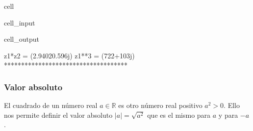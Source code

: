 \documentclass[letterpaper,10pt,english]{jupyterBook}
\begin{document}
\begin{sphinxuseclass}{cell}\begin{sphinxVerbatimInput}

\begin{sphinxuseclass}{cell_input}
\begin{sphinxVerbatim}[commandchars=\\\{\}]
  
  
 
 
\end{sphinxVerbatim}

\end{sphinxuseclass}\end{sphinxVerbatimInput}
\begin{sphinxVerbatimOutput}

\begin{sphinxuseclass}{cell_output}
\begin{sphinxVerbatim}[commandchars=\\\{\}]
z1*z2 =  (2.9402\PYGZhy{}0.596j)
z1**3 =  (\PYGZhy{}722+103j)
************************************
\end{sphinxVerbatim}

\end{sphinxuseclass}\end{sphinxVerbatimOutput}

\end{sphinxuseclass}

\subsubsection{Valor absoluto}
\label{\detokenize{docs/Part_01_Formalismo/Chapter_01_02_Formalismo_matem_xe1tico/01_01_Numeros_Complejos_myst:valor-absoluto}}
\sphinxAtStartPar
El cuadrado de un número real \(a\in {\mathbb R}\) es otro número real positivo \(a^2 >0\). Ello nos permite definir
el valor absoluto \(|a| = \sqrt{a^2}\) que es el mismo para \(a\) y para \(-a\).
\end{document}
